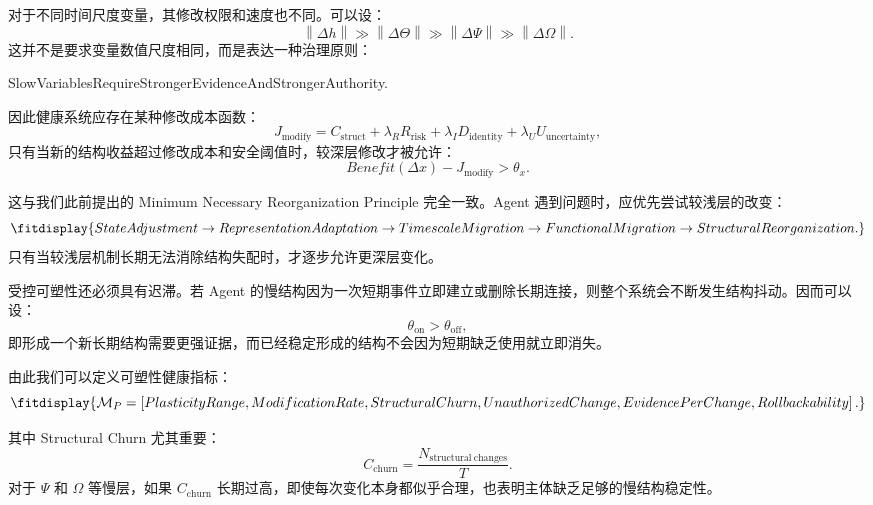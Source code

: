 对于不同时间尺度变量，其修改权限和速度也不同。可以设：
\begin{equation}
\left\|
\Delta h
\right\|
\gg
\left\|
\Delta\Theta
\right\|
\gg
\left\|
\Delta\Psi
\right\|
\gg
\left\|
\Delta\Omega
\right\|.
\end{equation}
这并不是要求变量数值尺度相同，而是表达一种治理原则：
\begin{statementbox}
SlowVariablesRequireStrongerEvidenceAndStrongerAuthority.
\end{statementbox}

因此健康系统应存在某种修改成本函数：
\begin{equation}
J_{\mathrm{modify}}
=
C_{\mathrm{struct}}
+
\lambda_R R_{\mathrm{risk}}
+
\lambda_I D_{\mathrm{identity}}
+
\lambda_U U_{\mathrm{uncertainty}},
\end{equation}
只有当新的结构收益超过修改成本和安全阈值时，较深层修改才被允许：
\begin{equation}
Benefit(\Delta x)
-
J_{\mathrm{modify}}
>
\theta_x.
\end{equation}

这与我们此前提出的 Minimum Necessary Reorganization Principle 完全一致。Agent 遇到问题时，应优先尝试较浅层的改变：
\begin{equation}
\fitdisplay{
StateAdjustment
\rightarrow
RepresentationAdaptation
\rightarrow
TimescaleMigration
\rightarrow
FunctionalMigration
\rightarrow
StructuralReorganization.
}
\end{equation}
只有当较浅层机制长期无法消除结构失配时，才逐步允许更深层变化。

受控可塑性还必须具有迟滞。若 Agent 的慢结构因为一次短期事件立即建立或删除长期连接，则整个系统会不断发生结构抖动。因而可以设：
\begin{equation}
\theta_{\mathrm{on}}
>
\theta_{\mathrm{off}},
\end{equation}
即形成一个新长期结构需要更强证据，而已经稳定形成的结构不会因为短期缺乏使用就立即消失。

由此我们可以定义可塑性健康指标：
\begin{equation}
\fitdisplay{
\mathcal{M}_P
=
\left[
PlasticityRange,
ModificationRate,
StructuralChurn,
UnauthorizedChange,
EvidencePerChange,
Rollbackability
\right].
}
\end{equation}

其中 Structural Churn 尤其重要：
\begin{equation}
C_{\mathrm{churn}}
=
\frac{
N_{\mathrm{structural\ changes}}
}{
T
}.
\end{equation}
对于 $\Psi$ 和 $\Omega$ 等慢层，如果 $C_{\mathrm{churn}}$ 长期过高，即使每次变化本身都似乎合理，也表明主体缺乏足够的慢结构稳定性。

